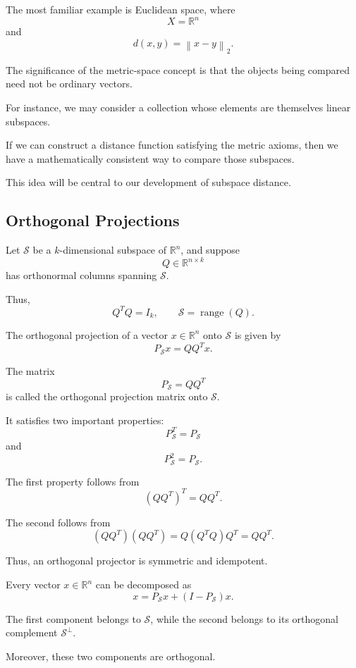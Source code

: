\documentclass[14pt,letterpaper]{article}
\theoremstyle{plain}
\theoremstyle{definition}
\theoremstyle{remark}
\newcommand{\R}{\mathbb{R}}
\newcommand{\norm}[1]{\left\lVert #1 \right\rVert}
\DeclareMathOperator{\range}{range}
\begin{document}
The most familiar example is Euclidean space,
where
\[
X=\R^n
\]
and
\[
\boxed{
d(x,y)=\norm{x-y}_2.
}
\]

The significance of the metric-space concept
is that the objects being compared need not
be ordinary vectors.

For instance, we may consider a collection
whose elements are themselves linear subspaces.

If we can construct a distance function
satisfying the metric axioms, then we have
a mathematically consistent way to compare
those subspaces.

This idea will be central to our development
of subspace distance.


\subsection{Orthogonal Projections}
\label{subsec:projection_background}

Let $\mathcal S$ be a $k$-dimensional
subspace of $\R^n$, and suppose
\[
Q\in\R^{n\times k}
\]
has orthonormal columns spanning $\mathcal S$.

Thus,
\[
Q^TQ=I_k,
\qquad
\mathcal S=\range(Q).
\]

The orthogonal projection of a vector
$x\in\R^n$ onto $\mathcal S$ is given by
\[
\boxed{
P_{\mathcal S}x=QQ^Tx.
}
\]

The matrix
\[
\boxed{
P_{\mathcal S}=QQ^T
}
\]
is called the orthogonal projection matrix
onto $\mathcal S$.

It satisfies two important properties:
\[
\boxed{
P_{\mathcal S}^T=P_{\mathcal S}
}
\]
and
\[
\boxed{
P_{\mathcal S}^2=P_{\mathcal S}.
}
\]

The first property follows from
\[
(QQ^T)^T=QQ^T.
\]

The second follows from
\[
(QQ^T)(QQ^T)
=
Q(Q^TQ)Q^T
=
QQ^T.
\]

Thus, an orthogonal projector is symmetric
and idempotent.

Every vector $x\in\R^n$ can be decomposed as
\[
\boxed{
x=P_{\mathcal S}x+(I-P_{\mathcal S})x.
}
\]

The first component belongs to $\mathcal S$,
while the second belongs to its orthogonal
complement $\mathcal S^\perp$.

Moreover, these two components are orthogonal.
\end{document}
